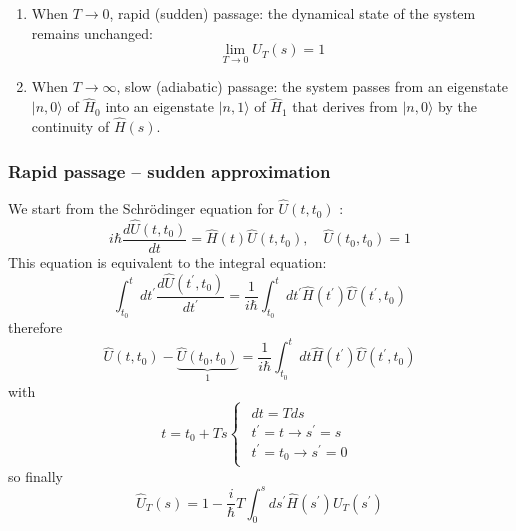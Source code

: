 \documentclass[12pt]{article}
\newcommand{\be}{\begin{equation}}
\newcommand{\ee}{\end{equation}}
\begin{document}
\begin{enumerate}
%
\item When $T \rightarrow 0$, rapid (sudden) passage: the dynamical
state of the system remains unchanged:
\be
\lim _{T \rightarrow 0} U_{T}(s)=1
\ee
\item When $T \rightarrow \infty$, slow (adiabatic) passage: the system
passes from an eigenstate $|n, 0\rangle$ of $\hat{H}_{0}$ into an
eigenstate $|n, 1\rangle$ of $\hat{H}_{1}$ that derives from $|n, 0\rangle$
by the continuity of $\hat{H}(s)$.
\end{enumerate}



\subsubsection{Rapid passage -- sudden approximation}

We start from the Schrödinger equation for $\hat{U}\left(t, t_{0}\right)$ :
\be
i \hbar \frac{d \hat{U}\left(t, t_{0}\right)}{d t}=\hat{H}(t) \hat{U}(t, t_0), \quad \hat{U}(t_0, t_0)=1
\label{eq:g6}
\ee
This equation is equivalent to the integral equation:
\be
\int_{t_{0}}^{t} d t^{\prime} \frac{d \hat{U}\left(t^{\prime}, t_{0}\right)}{d t^{\prime}}=\frac{1}{i \hbar} \int_{t_{0}}^{t} d t^{\prime} \hat{H}\left(t^{\prime}\right) \hat{U}\left(t^{\prime}, t_{0}\right)
\ee
therefore
\be
\hat{U}\left(t, t_{0}\right)-\underbrace{\hat{U}\left(t_{0}, t_{0}\right)}_1%
=\frac{1}{i \hbar} \int_{t_{0}}^{t} d t \hat{H}\left(t^{\prime}\right) \hat{U}\left(t^{\prime}, t_{0}\right)
\ee
with
\[
t = t_0 + Ts
\begin{cases}
\begin{gathered}
dt = T ds\\
t^\prime = t \to s^\prime = s\\
t^\prime = t_0 \to s^\prime = 0
\end{gathered}
\end{cases}
\]
so finally
\be
\hat{U}_{T}(s)=1-\frac{i}{\hbar} T \int_{0}^{s} d s^{\prime} \hat{H}\left(s^{\prime}\right) U_{T}\left(s^{\prime}\right)
\label{eq:g9}
\ee

\end{document}
